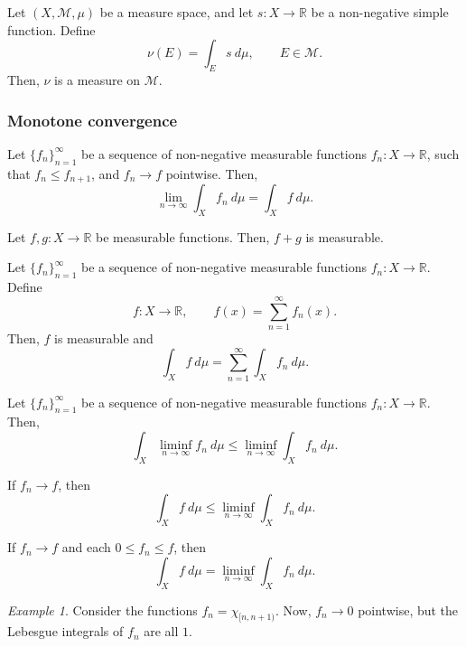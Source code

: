 \documentclass[11pt]{article}
\newcommand{\R}{\mathbb{R}}
\newcommand{\M}{\mathcal{M}}
\theoremstyle{definition}
\theoremstyle{remark}
\newtheorem*{example}{Example}
\numberwithin{equation}{section}
\begin{document}
    \begin{lemma}
        Let $(X, \M, \mu)$ be a measure space, and let $s\colon X \to \R$ be a
        non-negative simple function. Define \[
            \nu(E) = \int_E s\:d\mu, \qquad E \in \M.
        \] Then, $\nu$ is a measure on $\M$.
    \end{lemma}

    
    \subsubsection{Monotone convergence}

    \begin{theorem}
        Let $\{f_n\}_{n = 1}^\infty$ be a sequence of non-negative measurable
        functions $f_n\colon X \to \R$, such that $f_n \leq f_{n + 1}$, and $f_n \to
        f$ pointwise. Then, \[
            \lim_{n \to \infty} \int_X f_n\:d\mu = \int_X f\:d\mu.
        \] 
    \end{theorem}

    \begin{lemma}
        Let $f,g\colon X \to \R$ be measurable functions. Then, $f + g$ is measurable.
    \end{lemma}

    \begin{theorem}
        Let $\{f_n\}_{n = 1}^\infty$ be a sequence of non-negative measurable
        functions $f_n\colon X \to \R$. Define \[
            f\colon X \to \R, \qquad f(x) = \sum_{n = 1}^\infty f_n(x).
        \] Then, $f$ is measurable and \[
            \int_X f\:d\mu = \sum_{n = 1}^\infty \int_X f_n\:d\mu.
        \] 
    \end{theorem}

    \begin{theorem}[Fatou]
        Let $\{f_n\}_{n = 1}^\infty$ be a sequence of non-negative measurable
        functions $f_n\colon X \to \R$. Then, \[
            \int_X \liminf_{n \to \infty} f_n\:d\mu \leq \liminf_{n\to \infty} \int_X
            f_n\:d\mu.
        \] 
    \end{theorem}
    \begin{corollary}
        If $f_n \to f$, then \[
            \int_X f\:d\mu \leq \liminf_{n\to \infty} \int_X f_n\:d\mu.
        \] 
    \end{corollary}
    \begin{corollary}
        If $f_n \to f$ and each $0 \leq f_n \leq f$, then \[
            \int_X f\:d\mu = \liminf_{n\to \infty} \int_X f_n\:d\mu.
        \] 
    \end{corollary}
    \begin{example}
        Consider the functions $f_n = \chi_{[n, n + 1)}$. Now, $f_n \to 0$ pointwise,
        but the Lebesgue integrals of $f_n$ are all $1$.
    \end{example}
\end{document}
